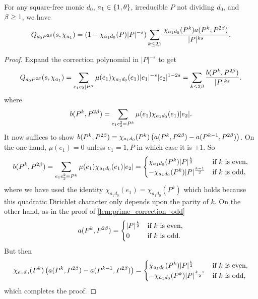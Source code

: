 \documentclass[12pt,reqno,oneside]{amsart}
\begin{document}
    \begin{lemma}\label{lem:prime_correction_even}
        For any square-free monic $d_{0}$, $a_{1} \in \{1,\theta\}$, irreducible $P$ not dividing $d_{0}$, and $\beta \ge 1$, we have
        \[
            Q_{d_{0}P^{2\beta}}(s,\chi_{a_{1}}) = (1-\chi_{a_{1}d_{0}}(P)|P|^{-s})\sum_{k \le 2\beta}\frac{\chi_{a_{1}d_{0}}(P^{k})a(P^{k},P^{2\beta})}{|P|^{ks}}.
        \]
    \end{lemma}
    \begin{proof}
        Expand the correction polynomial in $|P|^{-s}$ to get
        \[
            Q_{d_{0}P^{2\beta}}(s,\chi_{a_{1}}) = \sum_{e_{1}e_{2} \mid P^{\alpha}}\mu(e_{1})\chi_{a_{1}d_{0}}(e_{1})|e_{1}|^{-s}|e_{2}|^{1-2s} = \sum_{k \le 2\beta}\frac{b(P^{k},P^{2\beta})}{|P|^{ks}}.
        \]
        where
        \[
            b(P^{k},P^{2\beta}) = \sum_{e_{1}e_{2}^{2} = P^{k}}\mu(e_{1})\chi_{a_{1}d_{0}}(e_{1})|e_{2}|.
        \]
        It now suffices to show $b(P^{k},P^{2\beta}) = \chi_{a_{1}d_{0}}(P^{k})\left(a(P^{k},P^{2\beta})-a(P^{k-1},P^{2\beta})\right)$. On the one hand, $\mu(e_{1}) = 0$ unless $e_{1} = 1,P$ in which case it is $\pm1$. So
        \[
            b(P^{k},P^{2\beta}) = \sum_{e_{1}e_{2}^{2} = P^{k}}\mu(e_{1})\chi_{a_{1}d_{0}}(e_{1})|e_{2}| = \begin{cases} \chi_{a_{1}d_{0}}(P^{k})|P|^{\frac{k}{2}} & \text{if $k$ is even}, \\ -\chi_{a_{1}d_{0}}(P^{k})|P|^{\frac{k-1}{2}} & \text{if $k$ is odd}, \end{cases}
        \]
        where we have used the identity $\chi_{a_{1}d_{0}}(e_{1}) = \chi_{a_{1}d_{0}}(P^{k})$ which holds because this quadratic Dirichlet character only depends upon the parity of $k$. On the other hand, as in the proof of \cref{lem:prime_correction_odd} 
        \[
            a(P^{k},P^{2\beta}) = \begin{cases} |P|^{\frac{k}{2}} & \text{if $k$ is even}, \\ 0 & \text{if $k$ is odd}. \end{cases}
        \]
        But then
        \[
            \chi_{a_{1}d_{0}}(P^{k})\left(a(P^{k},P^{2\beta})-a(P^{k-1},P^{2\beta})\right) = \begin{cases} \chi_{a_{1}d_{0}}(P^{k})|P|^{\frac{k}{2}} & \text{if $k$ is even}, \\ -\chi_{a_{1}d_{0}}(P^{k})|P|^{\frac{k-1}{2}} & \text{if $k$ is odd}, \end{cases}
        \]
        which completes the proof.
    \end{proof}
\end{document}
